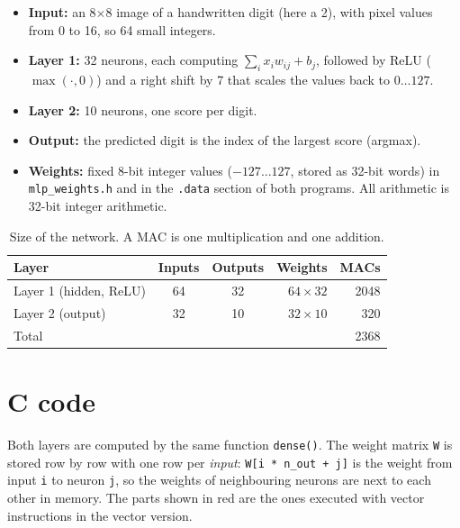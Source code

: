 \documentclass[11pt,a4paper]{article}
\newcommand{\code}[1]{\texttt{#1}}
\begin{document}
\begin{itemize}
  \item \textbf{Input:} an 8$\times$8 image of a handwritten digit (here a 2), with pixel values
        from 0 to 16, so 64 small integers.
  \item \textbf{Layer 1:} 32 neurons, each computing $\sum_i x_i w_{ij} + b_j$, followed by ReLU
        ($\max(\cdot, 0)$) and a right shift by 7 that scales the values back to $0 \ldots 127$.
  \item \textbf{Layer 2:} 10 neurons, one score per digit.
  \item \textbf{Output:} the predicted digit is the index of the largest score (argmax).
  \item \textbf{Weights:} fixed 8-bit integer values ($-127 \ldots 127$, stored as 32-bit words)
        in \code{mlp\_weights.h} and in the \code{.data} section of both programs. All arithmetic
        is 32-bit integer arithmetic.
\end{itemize}

\begin{table}[H]
\centering\small
\caption{Size of the network. A MAC is one multiplication and one addition.}
\label{tab:net}
\begin{tabular}{lccrr}
\toprule
Layer & Inputs & Outputs & Weights & MACs \\
\midrule
Layer 1 (hidden, ReLU) & 64 & 32 & $64 \times 32$ & 2048 \\
Layer 2 (output)       & 32 & 10 & $32 \times 10$ & 320 \\
\midrule
Total & & & & 2368 \\
\bottomrule
\end{tabular}
\end{table}

\section{C code}

Both layers are computed by the same function \code{dense()}. The weight matrix \code{W} is
stored row by row with one row per \emph{input}: \code{W[i * n\_out + j]} is the weight from
input \code{i} to neuron \code{j}, so the weights of neighbouring neurons are next to each other
in memory. The parts shown in red are the ones executed with vector instructions in the vector
version.
\end{document}
